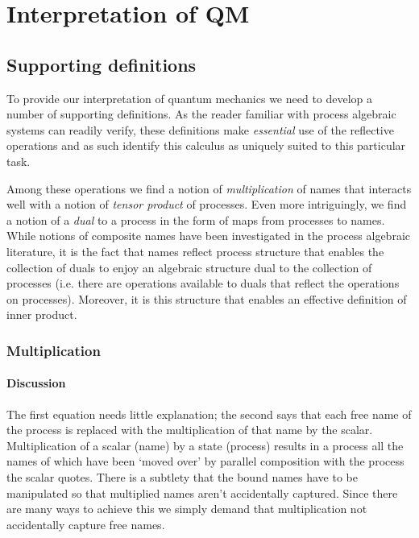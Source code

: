 \section{Interpretation of QM}
\subsection{Supporting definitions}

To provide our interpretation of quantum mechanics we need to develop
a number of supporting definitions. As the reader familiar with
process algebraic systems can readily verify, these definitions make
\emph{essential} use of the reflective operations and as such identify
this calculus as uniquely suited to this particular task.

Among these operations we find a notion of \emph{multiplication} of
names that interacts well with a notion of \emph{tensor product} of
processes. Even more intriguingly, we find a notion of a \emph{dual}
to a process in the form of maps from processes to names. While
notions of composite names have been investigated in the process
algebraic literature, it is the fact that names reflect process
structure that enables the collection of duals to enjoy an algebraic
structure dual to the collection of processes (i.e. there are
operations available to duals that reflect the operations on
processes). Moreover, it is this structure that enables an effective
definition of inner product.

\subsubsection{Multiplication}

\paragraph{Discussion}
The first equation needs little explanation; the second says that each
free name of the process is replaced with the multiplication of that
name by the scalar. Multiplication of a scalar (name) by a state
(process) results in a process all the names of which have been `moved
over' by parallel composition with the process the scalar
quotes. There is a subtlety that the bound names have to be
manipulated so that multiplied names aren't accidentally
captured. Since there are many ways to achieve this we simply demand
that multiplication not accidentally capture free names.

